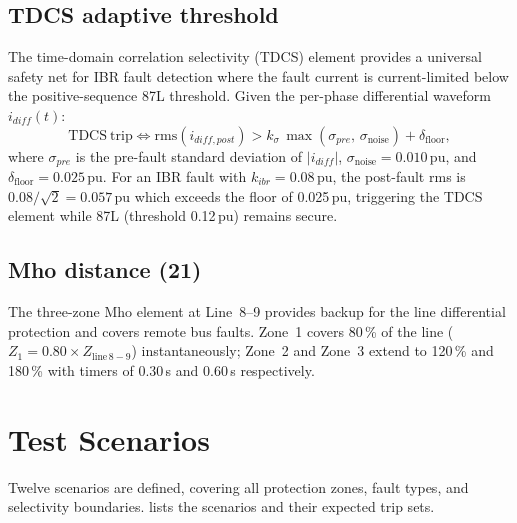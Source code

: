 \documentclass[12pt,a4paper]{article}
\begin{document}
\subsection{TDCS adaptive threshold}
\label{sec:tdcs}

The time-domain correlation selectivity (TDCS) element provides a universal
safety net for IBR fault detection where the fault current is current-limited
below the positive-sequence 87L threshold.  Given the per-phase differential
waveform $i_{diff}(t)$:
\begin{equation}
  \mathrm{TDCS\ trip} \iff
  \mathrm{rms}(i_{diff,post}) > k_\sigma\,\max(\sigma_{pre},\,\sigma_{\mathrm{noise}})
  + \delta_{\mathrm{floor}},
\end{equation}
where $\sigma_{pre}$ is the pre-fault standard deviation of $|i_{diff}|$,
$\sigma_{\mathrm{noise}} = 0.010$\,pu, and $\delta_{\mathrm{floor}} = 0.025$\,pu.
For an IBR fault with $k_{ibr} = 0.08$\,pu, the post-fault rms is
$0.08/\sqrt{2} = 0.057$\,pu which exceeds the floor of 0.025\,pu, triggering
the TDCS element while 87L (threshold 0.12\,pu) remains secure.

\subsection{Mho distance (21)}
\label{sec:21}

The three-zone Mho element at Line~8--9 provides backup for the line
differential protection and covers remote bus faults.  Zone~1 covers 80\,\%
of the line ($Z_1 = 0.80 \times Z_{\mathrm{line\,8-9}}$) instantaneously;
Zone~2 and Zone~3 extend to 120\,\% and 180\,\% with timers of 0.30\,s
and 0.60\,s respectively.

\section{Test Scenarios}
\label{sec:scenarios}

Twelve scenarios are defined, covering all protection zones, fault types,
and selectivity boundaries.   lists the scenarios and
their expected trip sets.
\end{document}

